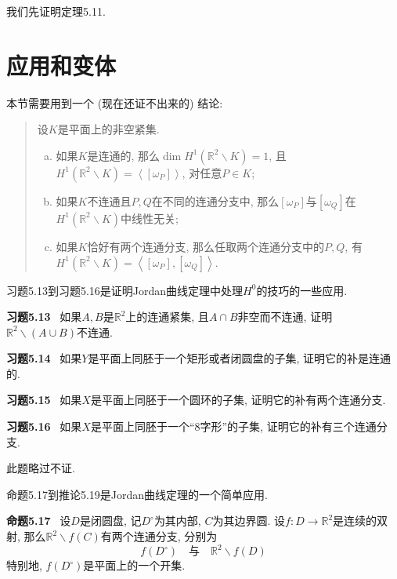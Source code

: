 \documentclass[11pt]{article}
\theoremstyle{definition}\newtheorem*{analyse}{分析}
\newenvironment{env}[1]{\par\vspace{1em}\noindent\textbf{#1}\ }{\par\vspace{1em}}
\begin{document}
我们先证明定理5.11.

\section{应用和变体}

本节需要用到一个 (现在还证不出来的) 结论:
\begin{quotation}
    设$K$是平面上的非空紧集.
    \begin{enumerate}[(a)]
        \item 如果$K$是连通的, 那么$\dim H^1(\mathbb{R}^2\backslash K)=1$, 且$H^1(\mathbb{R}^2\backslash K)=\left\langle[\omega_P]\right\rangle$, 对任意$P\in K$;
        \item 如果$K$不连通且$P,Q$在不同的连通分支中, 那么$[\omega_P]$与$[\omega_Q]$在$H^1(\mathbb{R}^2\backslash K)$中线性无关;
        \item 如果$K$恰好有两个连通分支, 那么任取两个连通分支中的$P,Q$, 有$H^1(\mathbb{R}^2\backslash K)=\left\langle[\omega_P],[\omega_Q]\right\rangle$.
    \end{enumerate}
\end{quotation}

习题5.13到习题5.16是证明Jordan曲线定理中处理$H^0$的技巧的一些应用.
\begin{env}{习题5.13}
    如果$A,B$是$\mathbb{R}^2$上的连通紧集, 且$A\cap B$非空而不连通, 证明$\mathbb{R}^2\backslash(A\cup B)$不连通.
\end{env}

\begin{env}{习题5.14}
    如果$Y$是平面上同胚于一个矩形或者闭圆盘的子集, 证明它的补是连通的.
\end{env}

\begin{env}{习题5.15}
    如果$X$是平面上同胚于一个圆环的子集, 证明它的补有两个连通分支.
\end{env}

\begin{env}{习题5.16}
    如果$X$是平面上同胚于一个``$8$字形''的子集, 证明它的补有三个连通分支.
\end{env}
此题略过不证.

命题5.17到推论5.19是Jordan曲线定理的一个简单应用.
\begin{env}{命题5.17}
    设$D$是闭圆盘, 记$D^\circ$为其内部, $C$为其边界圆.
    设$f:D\to\mathbb{R}^2$是连续的双射, 那么$\mathbb{R}^2\backslash f(C)$有两个连通分支, 分别为
    \[f(D^\circ)\quad\text{与}\quad\mathbb{R}^2\backslash f(D)\]
    特别地, $f(D^\circ)$是平面上的一个开集.
\end{env}
\end{document}
